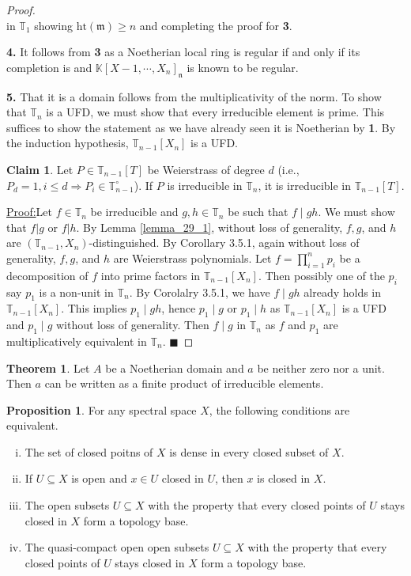 \documentclass[10pt]{article}
\numberwithin{equation}{section}
\theoremstyle{definition}
\newtheorem{theorem}{Theorem} [subsection]
\newtheorem{proposition}{Proposition}[subsection]
\newtheorem{claim}{Claim}
\newenvironment{claimproof}[1]{\par\noindent\underline{Proof:}\space#1}{\hfill $\blacksquare$}
\newcommand{\m}[0]{\mathfrak{m}}
\newcommand{\T}[0]{\mathbb{T}}
\newcommand{\K}[0]{\mathbb{K}}
\begin{document}
\begin{proof}
\begin{equation*}
  \end{equation*}
  in $\T_1$ showing $\mathrm{ht}(\m) \geq n$ and completing the proof for \textbf{3}.
  \par\textbf{4.} It follows from \textbf{3} as a Noetherian local ring is regular if and only if its completion is and $\K[X-1,\cdots,X_n]_\mathfrak{n}$ is known to be regular.
  \par\textbf{5.} That it is a domain follows from the multiplicativity of the norm. To show that $\T_n$ is a UFD, we must show that every irreducible element is prime. This suffices to show the statement as we have already seen it is Noetherian by \textbf{1}. By the induction hypothesis, $\T_{n-1}[X_n]$ is a UFD. 
  \begin{claim}
  Let $P\in\T_{n-1}[T]$ be Weierstrass of degree $d$ (i.e., $P_d=1, i\leq d\Rightarrow P_i\in\T^\circ_{n-1}$). If $P$ is irreducible in $\T_n$, it is irreducible in $\T_{n-1}[T]$. 
  \end{claim}
  \begin{claimproof}
  Let $f\in\T_n$ be irreducible and $g,h\in\T_n$ be such that $f\mid gh$. We must show that $f|g$ or $f|h$. By Lemma \ref{lemma_29_1}, without loss of generality, $f,g$, and $h$ are $(\T_{n-1},X_n)$-distinguished. By Corollary 3.5.1, again without loss of generality, $f,g$, and $h$ are Weierstrass polynomials. Let $f = \prod_{i=1}^np_i$ be a decomposition of $f$ into prime factors in $\T_{n-1}[X_n]$. Then possibly one of the $p_i$ say $p_1$ is a non-unit in $\T_n$. By Corolalry 3.5.1, we have $f\mid gh$ already holds in $\T_{n-1}[X_n]$. This implies $p_1\mid gh$, hence $p_1\mid g$ or $p_1\mid h$ as $\T_{n-1}[X_n]$ is a UFD and $p_1\mid g$ without loss of generality. Then $f\mid g$ in $\T_n$ as $f$ and $p_1$ are multiplicatively equivalent in $\T_n$.
\end{claimproof}
\par
\end{proof}
\begin{theorem}
    \label{theorem_31_0}
    Let $A$ be a Noetherian domain and $a$ be neither zero nor a unit. Then $a$ can be written as a finite product of irreducible elements.
\end{theorem}
\begin{proposition}
    \label{fact_31_6}
    For any spectral space $X$, the following conditions are equivalent.
    \begin{enumerate}[i. ]
        \item The set of closed poitns of $X$ is dense in every closed subset of $X$.
        \item If $U\subseteq X$ is open and $x\in U$ closed in $U$, then $x$ is closed in $X$.
        \item The open subsets $U\subseteq X$ with the property that every closed points of $U$ stays closed in $X$ form a topology base. 
        \item The quasi-compact open open subsets $U\subseteq X$ with the property that every closed points of $U$ stays closed in $X$ form a topology base.
    \end{enumerate}
\end{proposition}
\end{document}
